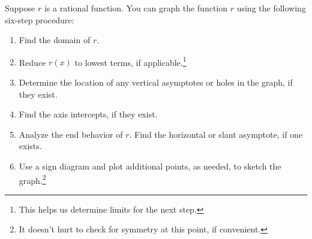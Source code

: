 \documentclass{ximera}
\begin{document}
	\author{Stitz-Zeager}


Suppose $r$ is a rational function.  You can graph the function $r$ using the following six-step procedure:

\begin{enumerate}

\item  Find the domain of $r$.

\item  Reduce $r(x)$ to lowest terms, if applicable.\footnote{This helps us determine limits for the next step.}

\item  Determine the location of any vertical asymptotes or holes in the graph, if they exist. 

\item  Find the axis intercepts, if they exist.

\item  Analyze the end behavior of $r$.  Find the horizontal or slant asymptote, if one exists.

\item  Use a sign diagram and plot additional points, as needed, to sketch the graph.\footnote{It doesn't hurt to check for symmetry at this point, if convenient.}

\end{enumerate}
\end{document}
